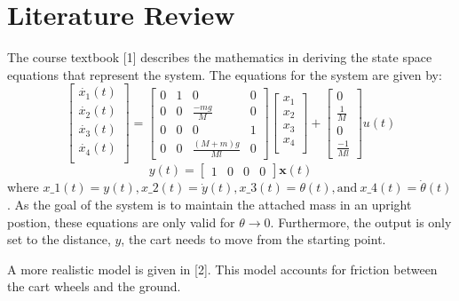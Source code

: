 \documentclass[11pt]{article}
\begin{document}
\section{Literature Review}\label{literature-review}

The course textbook {[}1{]} describes the mathematics in deriving the
state space equations that represent the system. The equations for the
system are given by: \[
\begin{bmatrix}
    \dot{x_1}(t)\\
    \dot{x_2}(t)\\
    \dot{x_3}(t)\\
    \dot{x_4}(t)\\
\end{bmatrix}=\begin{bmatrix}
    0 & 1 & 0 & 0 \\
    0 & 0 & \frac{-mg}{M} & 0 \\
    0 & 0 & 0 & 1 \\
    0 & 0 & \frac{(M+m)g}{Ml} & 0
    \end{bmatrix}\begin{bmatrix}
    x_1 \\
    x_2 \\
    x_3 \\
    x_4 \\
    \end{bmatrix} + \begin{bmatrix}
    0 \\ \frac{1}{M} \\ 0 \\ \frac{-1}{Ml}
    \end{bmatrix} u(t) 
    \]\[
    y(t) = \begin{bmatrix}
    1 & 0 & 0 & 0
    \end{bmatrix}\mathbf{x}(t)
\] where $ x\_1(t) = y(t), x\_2(t)=\dot{y}(t),x\_3(t) =\theta(t),
\mathrm{and\ } x\_4(t)=\dot{\theta}(t)$. As the goal of the system is
to maintain the attached mass in an upright postion, these equations are
only valid for \(\theta \rightarrow 0\). Furthermore, the output is only
set to the distance, \(y\), the cart needs to move from the starting
point.

    A more realistic model is given in {[}2{]}. This model accounts for
friction between the cart wheels and the ground.
\end{document}
